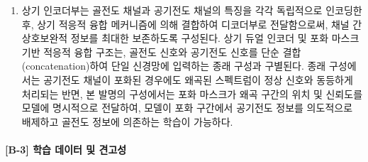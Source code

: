 \documentclass{article}
\begin{document}
\begin{enumerate}[label = \textbf{(B.2.\arabic*)}]
    \item 상기 인코더부는 골전도 채널과 공기전도 채널의 특징을 각각
    독립적으로 인코딩한 후, 상기 적응적 융합 메커니즘에 의해 결합하여
    디코더부로 전달함으로써, 채널 간 상호보완적 정보를 최대한 보존하도록
    구성된다. 상기 듀얼 인코더 및 포화 마스크 기반 적응적 융합 구조는, 골전도 신호와 공기전도 신호를 단순 결합(concatenation)하여 단일 신경망에 입력하는 종래 구성과 구별된다. 종래 구성에서는 공기전도 채널이 포화된 경우에도 왜곡된 스펙트럼이 정상 신호와 동등하게 처리되는 반면, 본 발명의 구성에서는 포화 마스크가 왜곡 구간의 위치 및 신뢰도를 모델에 명시적으로 전달하여, 모델이 포화 구간에서 공기전도 정보를 의도적으로 배제하고 골전도 정보에 의존하는 학습이 가능하다.

\end{enumerate}


\paragraph{[B-3] 학습 데이터 및 견고성}
\end{document}
